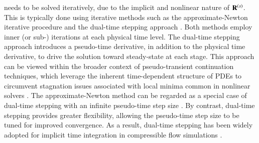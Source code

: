 {\begin{equation}
\end{equation}
needs to be solved iteratively, due to the implicit and nonlinear nature of $\mathbf{R}^{\left(s\right)}$. This is typically done using iterative methods such as the approximate-Newton iterative procedure \cite{rai1987navier} and the dual-time stepping approach \cite{jameson1991time,arnone1995integration,derango1997improvements}. Both methods employ inner (or sub-) iterations at each physical time level. 
The dual-time stepping approach introduces a pseudo-time derivative, in addition to the physical time derivative, to drive the solution toward steady-state at each stage. 
This approach can be viewed within the broader context of pseudo-transient continuation techniques, which leverage the inherent time-dependent structure of PDEs to circumvent stagnation issues associated with local minima common in nonlinear solvers \cite{kelley1998convergence}.
The approximate-Newton method can be regarded as a special case of dual-time stepping with an infinite pseudo-time step size \cite{venkateswaran1995dual}. By contrast, dual-time stepping provides greater flexibility, allowing the pseudo-time step size to be tuned for improved convergence. As a result, dual-time stepping has been widely adopted for implicit time integration in compressible flow simulations \cite{zhang2004block,jameson2009assessment,liu2018dynamic}.
}
